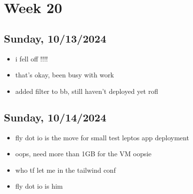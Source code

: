 \newpage
\section{Week 20}

\subsection*{Sunday, 10/13/2024}
\begin{itemize}
    \item i fell off !!!!
    \item that's okay, been busy with work
    \item added filter to bb, still haven't deployed yet rofl
\end{itemize}

\subsection*{Sunday, 10/14/2024}
\begin{itemize}
    \item fly dot io is the move for small test leptos app deployment
    \item oops, need more than 1GB for the VM oopsie
    \item who tf let me in the tailwind conf
    \item fly dot io is him
\end{itemize}
